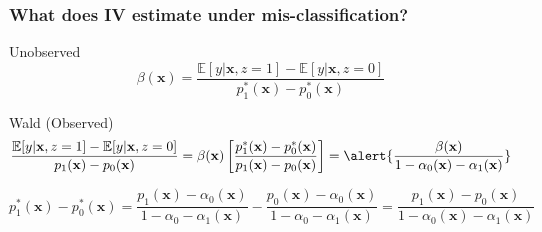 \documentclass[handout]{beamer}
\begin{document}
\begin{frame}[label=IV_APPEND]
  \frametitle{What does IV estimate under mis-classification?}
  \begin{block}{Unobserved}
  \[
    \beta(\mathbf{x}) = \frac{\mathbb{E}[y|\mathbf{x},z=1] - \mathbb{E}[y|\mathbf{x},z=0]}{p^*_1(\mathbf{x}) - p^*_0(\mathbf{x})} 
  \]
  \end{block}

  \begin{block}{Wald (Observed)}
    \vspace{-1em}
    \small
    \[
      \frac{\mathbb{E}[y|\mathbf{x},z=1] - \mathbb{E}[y|\mathbf{x},z=0]}{p_1(\mathbf{x}) - p_0(\mathbf{x})} = \beta(\mathbf{x})\left[ \frac{p_1^*(\mathbf{x}) - p_0^*(\mathbf{x})}{p_1(\mathbf{x}) - p_0(\mathbf{x})} \right] = \alert{\frac{\beta(\mathbf{x})}{1 - \alpha_0(\mathbf{x}) - \alpha_1(\mathbf{x})} }
    \]
   
    \vspace{2em}
    \scriptsize
    \[
      \boxed{p_1^*(\mathbf{x}) - p_0^*(\mathbf{x}) = \frac{p_1(\mathbf{x}) - \alpha_0(\mathbf{x})}{1 - \alpha_0 - \alpha_1(\mathbf{x})} -   \frac{p_0(\mathbf{x}) - \alpha_0(\mathbf{x})}{1 - \alpha_0 - \alpha_1(\mathbf{x})} = \frac{p_1(\mathbf{x}) - p_0(\mathbf{x})}{1 - \alpha_0(\mathbf{x}) - \alpha_1(\mathbf{x})}}
    \]
  \end{block}
    \hyperlink{BOUNDS_BODY}{}
\end{frame}
\end{document}
